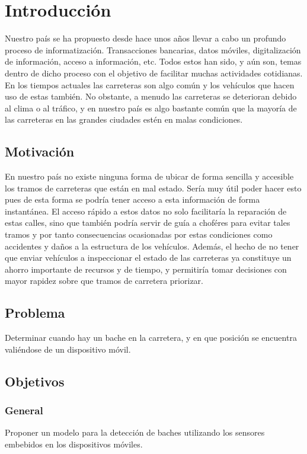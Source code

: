 \chapter*{Introducción}\label{chapter:introduction}

Nuestro país se ha propuesto desde hace unos años llevar a cabo un profundo proceso de informatización.
Transacciones bancarias, datos móviles, digitalización de información, acceso a información, etc. Todos
estos han sido, y aún son, temas dentro de dicho proceso con el objetivo de facilitar muchas actividades
cotidianas. En los tiempos actuales las carreteras son algo común y los vehículos que hacen uso de estas
también. No obstante, a menudo las carreteras se deterioran debido al clima o al tráfico, y en nuestro
país es algo bastante común que la mayoría de las carreteras en las grandes ciudades estén en malas condiciones.

\section*{Motivación}
En nuestro país no existe ninguna forma de ubicar de forma sencilla y accesible los tramos de carreteras que están
en mal estado. Sería muy útil poder hacer esto pues de esta forma se podría tener acceso a esta información de forma
instantánea. El acceso rápido a estos datos no solo facilitaría la reparación de estas calles, sino que también podría
servir de guía a choféres para evitar tales tramos y por tanto consecuencias ocasionadas por estas condiciones como 
accidentes y daños a la estructura de los vehículos. Además, el hecho de no tener que enviar vehículos a inspeccionar
el estado de las carreteras ya constituye un ahorro importante de recursos y de tiempo, y permitiría tomar decisiones 
con mayor rapidez sobre que tramos de carretera priorizar.

\section*{Problema}
Determinar cuando hay un bache en la carretera, y en que posición se encuentra valiéndose de un dispositivo móvil.

\section*{Objetivos}
\subsection*{General}
Proponer un modelo para la detección de baches utilizando los sensores embebidos en los dispositivos móviles.

